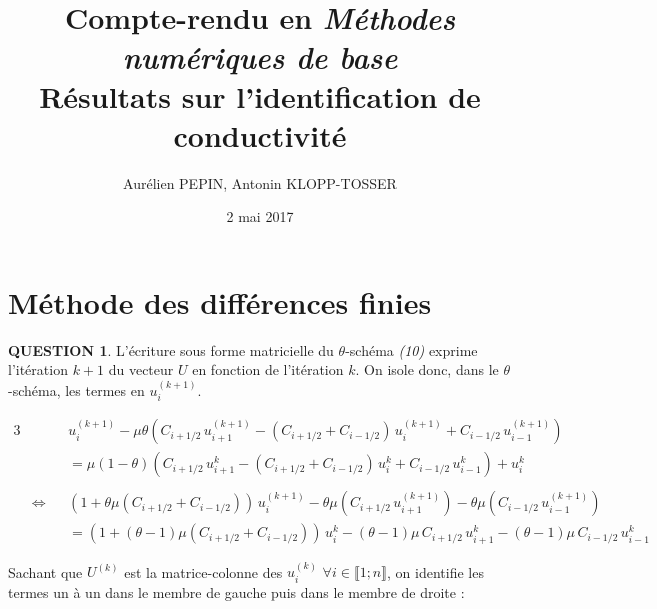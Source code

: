 \documentclass[a4paper,11pt]{article}
\title{Compte-rendu en \textit{Méthodes numériques de base} \\
\textbf{Résultats sur l'identification de conductivité}}
\author{Aurélien PEPIN, Antonin KLOPP-TOSSER}
\date{2 mai 2017}
\newcommand{\quest}[1]{\small\textbf{#1}\normalsize}
\theoremstyle{nonumberplain}
\theoremstyle{nonumberplain}
\begin{document}
\maketitle

\section{Méthode des différences finies}

    \quest{QUESTION 1}. L'écriture sous forme matricielle du $\theta$-schéma \textit{(10)} exprime l'itération $k + 1$ du vecteur $U$ en fonction de l'itération $k$.
    On isole donc, dans le $\theta$-schéma, les termes en $u_{i}^{(k + 1)}$.

    \begin{calculs}
        \begin{alignat*}{3}
            & & & u_{i}^{(k + 1)} - \mu\theta\left(C_{i + 1/2}\,u_{i + 1}^{(k + 1)} - (C_{i + 1/2} + C_{i - 1/2})\,u_{i}^{(k + 1)} + C_{i - 1/2}\,u_{i - 1}^{(k + 1)}\right) \\
            & & & = \mu(1 - \theta)\left(C_{i + 1/2}\,u_{i + 1}^{k} - (C_{i + 1/2} + C_{i - 1/2})\,u_{i}^{k} + C_{i - 1/2}\,u_{i - 1}^{k}\right) + u_{i}^{k} \\
            & & & \\
            & \iff & & \left(1+\theta\mu(C_{i + 1/2} + C_{i - 1/2})\right)\,u_{i}^{(k + 1)} - \theta\mu(C_{i + 1/2}\,u_{i + 1}^{(k + 1)}) - \theta\mu(C_{i - 1/2}\,u_{i - 1}^{(k + 1)}) \\
            & & & = \left(1 + (\theta - 1)\mu(C_{i + 1/2} + C_{i - 1/2})\right)\,u_{i}^{k} - (\theta - 1)\mu\,C_{i + 1/2}\,u_{i + 1}^{k} - (\theta - 1)\mu\,C_{i - 1/2}\,u_{i - 1}^{k}
        \end{alignat*}
    \end{calculs}

    \medskip
    Sachant que $U^{(k)}$ est la matrice-colonne des $u_{i}^{(k)}$ $\forall i \in \llbracket 1; n \rrbracket$, on identifie
    les termes un à un dans le membre de gauche puis dans le membre de droite :
\end{document}
